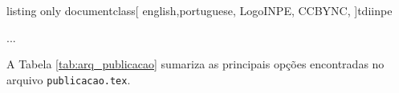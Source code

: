\begin{texexp}{listing only}
documentclass[
english,portuguese, 
LogoINPE,
CCBYNC,
]{tdiinpe}


...
\end{texexp}

A Tabela \ref{tab:arq_publicacao} sumariza as principais opções encontradas no arquivo {\tt publicacao.tex}.

